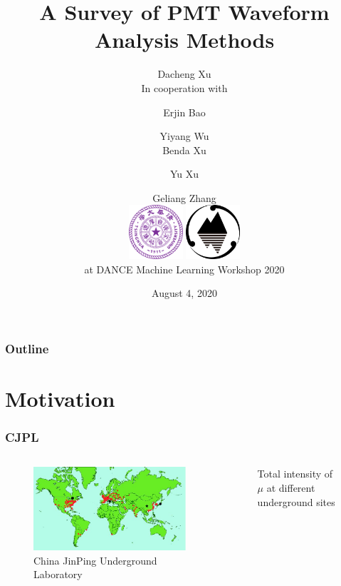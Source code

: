 \documentclass{beamer}
\title[Waveform Analysis]{A Survey of PMT Waveform Analysis Methods}
\author[Dacheng Xu]{Dacheng Xu \\ [4mm] In cooperation with \and Erjin Bao \and Yiyang Wu  \\ Benda Xu \and Yu Xu \and Geliang Zhang \\ [4mm] \includegraphics[height=2cm]{img/Tsinghua_University_Logo.png} \hspace{6mm} \includegraphics[height=2cm]{img/Js.png} \\ [4mm] at DANCE Machine Learning Workshop 2020 \\ [-8mm]}
\date[DANCE]{August 4, 2020}
\begin{document}
\frame{\titlepage}

\begin{frame}[noframenumbering]
\frametitle{Outline}
\thispagestyle{empty}
\tableofcontents
\end{frame}

\section{Motivation}
\begin{frame}
\setlength{\abovecaptionskip}{0mm}
\setlength{\belowcaptionskip}{0mm}
\setcounter{page}{0}
\frametitle{CJPL}
\begin{columns}
\begin{figure}
    \centering
    \caption{China JinPing Underground Laboratory}
    \includegraphics[width=1.0\linewidth]{img/WorldMap.jpg}
\end{figure}
\begin{figure}
    \centering
    \caption{Total intensity of $\mu$ at different underground sites}

\end{figure}
\end{columns}
\end{frame}
\end{document}

